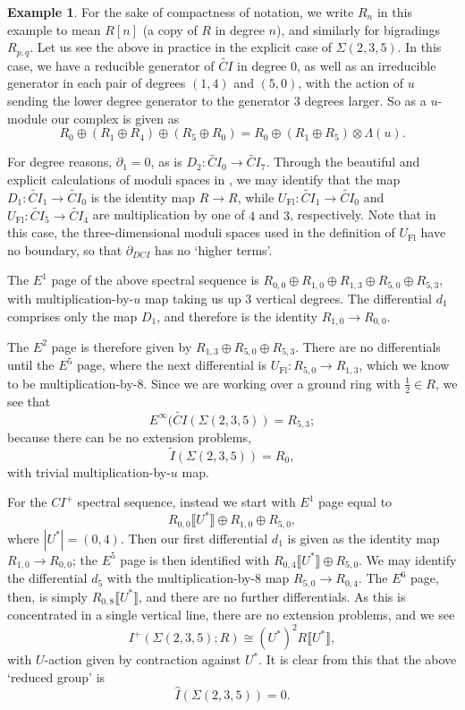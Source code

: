 \documentclass{memo-l}
\theoremstyle{definition}
\newtheorem{example}[theorem]{Example}
\theoremstyle{remark}
\numberwithin{section}{chapter}
\numberwithin{equation}{chapter}
\begin{document}
\begin{example}For the sake of compactness of notation, we write $R_{n}$ in this example to mean $R[n]$ (a copy of $R$ in degree $n$), and similarly for bigradings $R_{p,q}$. Let us see the above in practice in the explicit case of $\Sigma(2,3,5)$. In this case, we have a reducible generator of $\widetilde{CI}$ in degree $0$, as well as an irreducible generator in each pair of degrees $(1,4)$ and $(5,0)$, with the action of $u$ sending the lower degree generator to the generator 3 degrees larger. So as a $u$-module our complex is given as $$R_0 \oplus (R_1 \oplus R_4) \oplus (R_5 \oplus R_0) = R_0 \oplus (R_1 \oplus R_5) \otimes \Lambda(u).$$

For degree reasons, $\partial_1 = 0$, as is $D_2: \widetilde{CI}_0 \to \widetilde{CI}_{7}$. Through the beautiful and explicit calculations of moduli spaces in \cite{austin1995equivariant}, we may identify that the map $D_1: \widetilde{CI}_1 \to \widetilde{CI}_0$ is the identity map $R \to R$, while $U_{\text{Fl}}: \widetilde{CI}_1 \to \widetilde{CI}_0$ and $U_{\text{Fl}}: \widetilde{CI}_5 \to \widetilde{CI}_4$ are multiplication by one of $4$ and $3$, respectively. Note that in this case, the three-dimensional moduli spaces used in the definition of $U_{\text{Fl}}$ have no boundary, so that $\partial_{DCI}$ has no `higher terms'.

The $E^1$ page of the above spectral sequence is $R_{0,0} \oplus R_{1,0} \oplus R_{1,3} \oplus R_{5,0} \oplus R_{5,3}$, with multiplication-by-$u$ map taking us up $3$ vertical degrees. The differential $d_1$ comprises only the map $D_1$, and therefore is the identity $R_{1,0} \to R_{0,0}$.

The $E^2$ page is therefore given by $R_{1,3} \oplus R_{5,0} \oplus R_{5,3}$. There are no differentials until the $E^5$ page, where the next differential is $U_{\text{Fl}}: R_{5,0} \to R_{1,3}$, which we know to be multiplication-by-$8$. Since we are working over a ground ring with $\frac 12 \in R$, we see that $$E^\infty(\widetilde{CI}(\Sigma(2,3,5)) = R_{5,3};$$ because there can be no extension problems, $$\widetilde I(\Sigma(2,3,5)) = R_0,$$ with trivial multiplication-by-$u$ map.

For the $CI^+$ spectral sequence, instead we start with $E^1$ page equal to $$R_{0,0}\llbracket U^*\rrbracket \oplus R_{1,0} \oplus R_{5,0},$$ where $|U^*| = (0,4)$. Then our first differential $d_1$ is given as the identity map $R_{1,0} \to R_{0,0}$; the $E^5$ page is then identified with $R_{0,4}\llbracket U^*\rrbracket \oplus R_{5,0}$. We may identify the differential $d_5$ with the multiplication-by-$8$ map $R_{5,0} \to R_{0,4}$. The $E^6$ page, then, is simply $R_{0,8}\llbracket U^*\rrbracket$, and there are no further differentials. As this is concentrated in a single vertical line, there are no extension problems, and we see $$I^+(\Sigma(2,3,5);R) \cong (U^*)^2 R\llbracket U^*\rrbracket,$$ with $U$-action given by contraction against $U^*$. It is clear from this that the above `reduced group' is $$\widehat{I}(\Sigma(2,3,5)) = 0.$$


\end{example}
\end{document}

